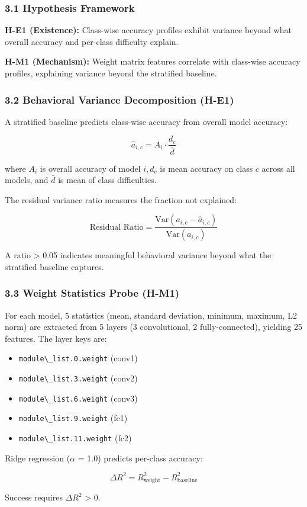 
\subsubsection{3.1 Hypothesis Framework}

\textbf{H-E1 (Existence):} Class-wise accuracy profiles exhibit variance beyond what overall accuracy and per-class difficulty explain.

\textbf{H-M1 (Mechanism):} Weight matrix features correlate with class-wise accuracy profiles, explaining variance beyond the stratified baseline.

\subsubsection{3.2 Behavioral Variance Decomposition (H-E1)}

A stratified baseline predicts class-wise accuracy from overall model accuracy:

$$\hat{a}_{i,c} = A_i \cdot \frac{d_c}{\bar{d}}$$

where $A_i$ is overall accuracy of model $i, d_c$ is mean accuracy on class $c$ across all models, and $\bar{d}$ is mean of class difficulties.

The residual variance ratio measures the fraction not explained:

$$\text{Residual Ratio} = \frac{\text{Var}(a_{i,c} - \hat{a}_{i,c})}{\text{Var}(a_{i,c})}$$

A ratio > 0.05 indicates meaningful behavioral variance beyond what the stratified baseline captures.

\subsubsection{3.3 Weight Statistics Probe (H-M1)}

For each model, 5 statistics (mean, standard deviation, minimum, maximum, L2 norm) are extracted from 5 layers (3 convolutional, 2 fully-connected), yielding 25 features. The layer keys are:
\begin{itemize}
\item \texttt{module\textbackslash \_list.0.weight} (conv1)
\item \texttt{module\textbackslash \_list.3.weight} (conv2)
\item \texttt{module\textbackslash \_list.6.weight} (conv3)
\item \texttt{module\textbackslash \_list.9.weight} (fc1)
\item \texttt{module\textbackslash \_list.11.weight} (fc2)
\end{itemize}

Ridge regression ($\alpha$ = 1.0) predicts per-class accuracy:

$$\Delta R^2 = R^2_{\text{weight}} - R^2_{\text{baseline}}$$

Success requires $\Delta R^2$ > 0.
